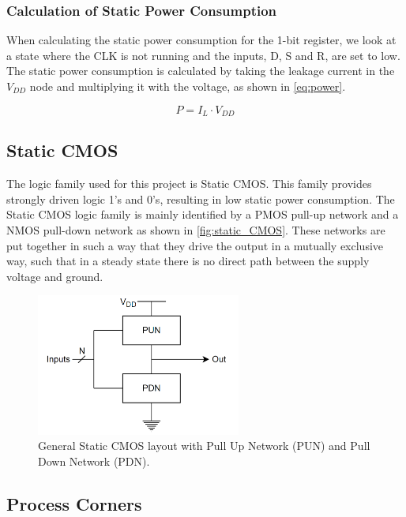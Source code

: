 \subsubsection{Calculation of Static Power Consumption}
When calculating the static power consumption for the 1-bit register, we look at a state where the CLK is not running and the inputs, D, S and R, are set to low. The static power consumption is calculated by taking the leakage current in the $V_{DD}$ node and multiplying it with the voltage, as shown in \autoref{eq:power}.

\begin{equation}
    \label{eq:power}
    P = I_L \cdot V_{DD}
\end{equation}

\subsection{Static CMOS}\label{subsec:static_cmos}

The logic family used for this project is Static CMOS. This family provides strongly driven logic 1's and 0's, resulting in low static power consumption. The Static CMOS logic family is mainly identified by a PMOS pull-up network and a NMOS pull-down network as shown in \autoref{fig:static_CMOS}. These networks are put together in such a way that they drive the output in a mutually exclusive way, such that in a steady state there is no direct path between the supply voltage and ground. 

\begin{figure}[H]
    \centering
    \includegraphics[width=0.6\textwidth]{Figures/Pull_UP_DOWN.png}
    \caption{General Static CMOS layout with Pull Up Network (PUN) and Pull Down Network (PDN).}
    \label{fig:static_CMOS}
\end{figure}


\subsection{Process Corners}
\label{subsec:corners}





